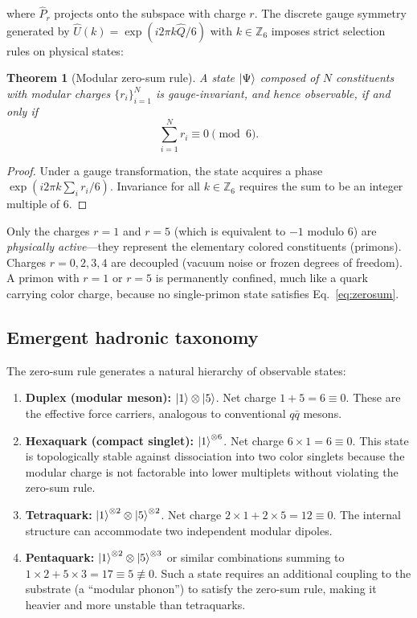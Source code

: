 \documentclass[12pt,a4paper]{article}
\theoremstyle{plain}
\newtheorem{theorem}{Theorem}[section]
\theoremstyle{definition}
\theoremstyle{remark}
\begin{document}
where \(\hat{P}_r\) projects onto the subspace with charge \(r\). The discrete gauge symmetry generated by \(\hat{U}(k) = \exp(i 2\pi k \hat{Q}/6)\) with \(k \in \mathbb{Z}_6\) imposes strict selection rules on physical states:

\begin{theorem}[Modular zero-sum rule]
\label{thm:zerosum}
A state \(\ket{\Psi}\) composed of \(N\) constituents with modular charges \(\{r_i\}_{i=1}^N\) is gauge-invariant, and hence observable, if and only if
\begin{equation}
\sum_{i=1}^N r_i \equiv 0 \pmod{6}.
\label{eq:zerosum}
\end{equation}
\end{theorem}

\begin{proof}
Under a gauge transformation, the state acquires a phase \(\exp(i 2\pi k \sum_i r_i / 6)\). Invariance for all \(k \in \mathbb{Z}_6\) requires the sum to be an integer multiple of 6.
\end{proof}

Only the charges \(r=1\) and \(r=5\) (which is equivalent to \(-1\) modulo 6) are \emph{physically active}---they represent the elementary colored constituents (primons). Charges \(r=0,2,3,4\) are decoupled (vacuum noise or frozen degrees of freedom). A primon with \(r=1\) or \(r=5\) is permanently confined, much like a quark carrying color charge, because no single-primon state satisfies Eq.~\eqref{eq:zerosum}.

\subsection{Emergent hadronic taxonomy}
The zero-sum rule generates a natural hierarchy of observable states:

\begin{enumerate}[label=(\alph*)]
    \item \textbf{Duplex (modular meson):} \(\ket{1} \otimes \ket{5}\). Net charge \(1+5 = 6 \equiv 0\). These are the effective force carriers, analogous to conventional \(q\bar{q}\) mesons.
    \item \textbf{Hexaquark (compact singlet):} \(\ket{1}^{\otimes 6}\). Net charge \(6 \times 1 = 6 \equiv 0\). This state is topologically stable against dissociation into two color singlets because the modular charge is not factorable into lower multiplets without violating the zero-sum rule.
    \item \textbf{Tetraquark:} \(\ket{1}^{\otimes 2} \otimes \ket{5}^{\otimes 2}\). Net charge \(2\times 1 + 2\times 5 = 12 \equiv 0\). The internal structure can accommodate two independent modular dipoles.
    \item \textbf{Pentaquark:} \(\ket{1}^{\otimes 2} \otimes \ket{5}^{\otimes 3}\) or similar combinations summing to \(1\times 2 + 5\times 3 = 17 \equiv 5 \not\equiv 0\). Such a state requires an additional coupling to the substrate (a ``modular phonon'') to satisfy the zero-sum rule, making it heavier and more unstable than tetraquarks.
\end{enumerate}
\end{document}

